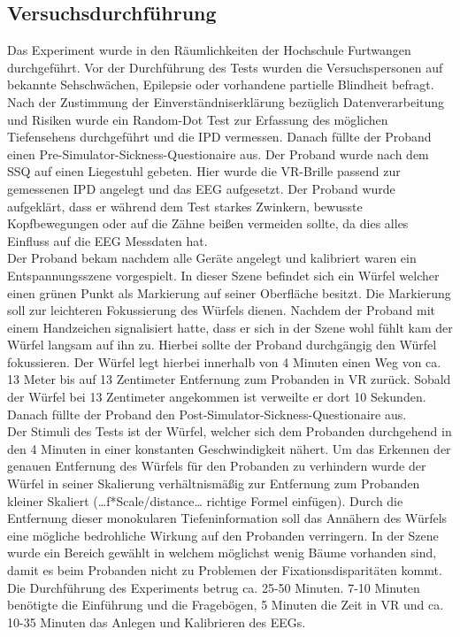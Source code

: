 \documentclass[conference]{IEEEtran}
\begin{document}
\subsection{Versuchsdurchführung}
Das Experiment wurde in den Räumlichkeiten der Hochschule Furtwangen durchgeführt. Vor der Durchführung des Tests wurden die Versuchspersonen auf bekannte Sehschwächen, Epilepsie oder vorhandene partielle Blindheit befragt. Nach der Zustimmung der Einverständniserklärung bezüglich Datenverarbeitung und Risiken wurde ein Random-Dot Test zur Erfassung des möglichen Tiefensehens durchgeführt und die IPD vermessen. Danach füllte der Proband einen Pre-Simulator-Sickness-Questionaire aus. Der Proband wurde nach dem SSQ auf einen Liegestuhl gebeten. Hier wurde die VR-Brille passend zur gemessenen IPD angelegt und das EEG aufgesetzt. Der Proband wurde aufgeklärt, dass er während dem Test starkes Zwinkern, bewusste Kopfbewegungen oder auf die Zähne beißen vermeiden sollte, da dies alles Einfluss auf die EEG Messdaten hat.\\
Der Proband bekam nachdem alle Geräte angelegt und kalibriert waren ein Entspannungsszene vorgespielt. In dieser Szene befindet sich ein Würfel welcher einen grünen Punkt als Markierung auf seiner Oberfläche besitzt. Die Markierung soll zur leichteren Fokussierung des Würfels dienen. Nachdem der Proband mit einem Handzeichen signalisiert hatte, dass er sich in der Szene wohl fühlt kam der Würfel langsam auf ihn zu. Hierbei sollte der Proband durchgängig den Würfel fokussieren. Der Würfel legt hierbei innerhalb von 4 Minuten einen Weg von ca. 13 Meter bis auf 13 Zentimeter Entfernung zum Probanden in VR zurück. Sobald der Würfel bei 13 Zentimeter angekommen ist verweilte er dort 10 Sekunden. Danach füllte der Proband den Post-Simulator-Sickness-Questionaire aus.\\
Der Stimuli des Tests ist der Würfel, welcher sich dem Probanden durchgehend in den 4 Minuten in einer konstanten Geschwindigkeit nähert. Um das Erkennen der genauen Entfernung des Würfels für den Probanden zu verhindern wurde der Würfel in seiner Skalierung verhältnismäßig zur Entfernung zum Probanden kleiner Skaliert (…f*Scale/distance… richtige Formel einfügen). Durch die Entfernung dieser monokularen Tiefeninformation soll das Annähern des Würfels eine mögliche bedrohliche Wirkung auf den Probanden verringern. In der Szene wurde ein Bereich gewählt in welchem möglichst wenig Bäume  vorhanden sind, damit es beim Probanden nicht zu Problemen der Fixationsdisparitäten kommt.\\
Die Durchführung des Experiments betrug ca. 25-50 Minuten. 7-10 Minuten benötigte die Einführung und die Fragebögen, 5 Minuten die Zeit in VR und ca. 10-35 Minuten das Anlegen und Kalibrieren des EEGs. 
\end{document}

